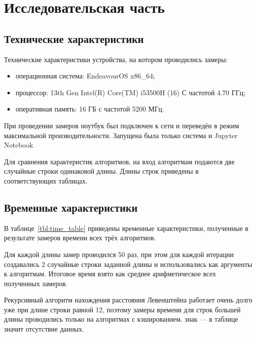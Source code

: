 \chapter{Исследовательская часть}

\section{Технические характеристики}

Технические характеристики устройства, на котором проводились замеры:

\begin{itemize}
	\item операционная система: EndeavourOS x86\_64;
	\item процессор: 13th Gen Intel(R) Core(TM) i53500H (16) С частотой 4.70 ГГц;
	\item оперативная память: 16 ГБ с частотой 5200 МГц.
\end{itemize}

При проведении замеров ноутбук был подключен к сети и переведён в режим максимальной производительности. Запущена была только система и Jupyter Notebook

Для сравнения характеристик алгоритмов, на вход алгоритмам подаются две случайные строки одинаковой длины. Длины строк приведены в соответствующих таблицах. 

\section{Временные характеристики}
В таблице~\ref{tbl:time_table} приведены временные характеристики, полученные в результате замеров времени всех трёх алгоритмов.

Для каждой длины замер проводился 50 раз, при этом для каждой итерации создавались 2 случайные строки заданной длины и использовались как аргументы к алгоритмам. Итоговое время взято как среднее арифметическое всех полученных замеров.

Рекурсивный алгоритм нахождения расстояния Левенштейна работает очень долго уже при длине строки равной 12, поэтому замеры времени для строк б\emph{о}льшей длины проводились только на алгоритмах с кэшированием. знак --- в таблице значит отсутствие данных.

